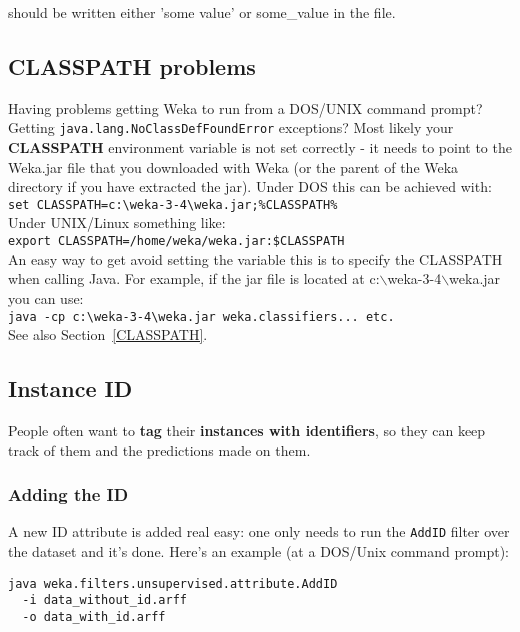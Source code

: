 \noindent should be written either 'some value' or some\_value in the file.

\subsection{CLASSPATH problems}
Having problems getting Weka to run from a DOS/UNIX command prompt?
Getting \verb=java.lang.NoClassDefFoundError= exceptions? Most likely your
\textbf{CLASSPATH} environment variable is not set correctly - it needs to
point to the Weka.jar file that you downloaded with Weka (or the
parent of the Weka directory if you have extracted the jar). Under DOS
this can be achieved with:\\

\verb^set CLASSPATH=c:\weka-3-4\weka.jar;%CLASSPATH%^\\

\noindent Under UNIX/Linux something like:\\

\verb^export CLASSPATH=/home/weka/weka.jar:$CLASSPATH^\\

\noindent An easy way to get avoid setting the variable this is to
specify the CLASSPATH when calling Java. For example, if the jar file
is located at c:$\backslash$weka-3-4$\backslash$weka.jar you can use:\\

\verb^java -cp c:\weka-3-4\weka.jar weka.classifiers... etc.^\\

\noindent See also Section~\ref{CLASSPATH}.

\subsection{Instance ID}
People often want to \textbf{tag} their \textbf{instances with
  identifiers}, so they can keep track of them and the predictions
made on them.

\subsubsection{Adding the ID}
A new ID attribute is added real easy: one only needs to run the \verb=AddID=
filter over the dataset and it's done. Here's an example (at a
DOS/Unix command prompt):\\

\begin{verbatim}
java weka.filters.unsupervised.attribute.AddID
  -i data_without_id.arff
  -o data_with_id.arff
\end{verbatim}

